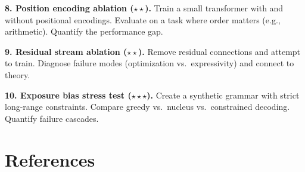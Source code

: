 \vspace{0.3cm}

\textbf{8. Position encoding ablation ($\star\star$).} Train a small transformer with and without positional encodings. Evaluate on a task where order matters (e.g., arithmetic). Quantify the performance gap.

\vspace{0.3cm}

\textbf{9. Residual stream ablation ($\star\star$).} Remove residual connections and attempt to train. Diagnose failure modes (optimization vs.\ expressivity) and connect to theory.

\vspace{0.3cm}

\textbf{10. Exposure bias stress test ($\star\star\star$).} Create a synthetic grammar with strict long-range constraints. Compare greedy vs.\ nucleus vs.\ constrained decoding. Quantify failure cascades.

\vspace{2em}

\section*{References}

